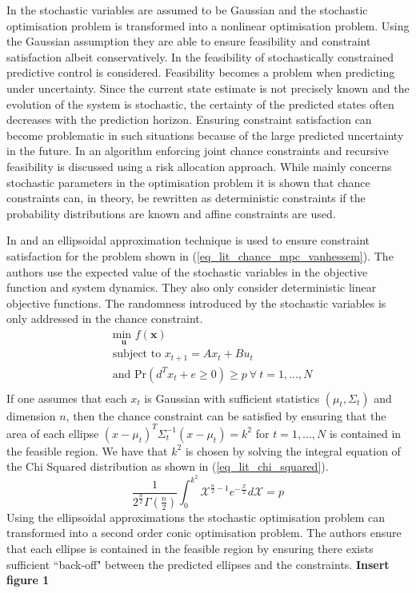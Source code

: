 In \cite{li2} the stochastic variables are assumed to be Gaussian and the stochastic optimisation problem is transformed into a nonlinear optimisation problem. Using the Gaussian assumption they are able to ensure feasibility and constraint satisfaction albeit conservatively. In \cite{masahiro} the feasibility of stochastically constrained predictive control is considered. Feasibility becomes a problem when predicting under uncertainty. Since the current state estimate is not precisely known and the evolution of the system is stochastic, the certainty of the predicted states often decreases with the prediction horizon. Ensuring constraint satisfaction can become problematic in such situations because of the large predicted uncertainty in the future. In \cite{masahiro} an algorithm enforcing joint chance constraints and recursive feasibility is discussed using a risk allocation approach. While \cite{schwarm} mainly concerns stochastic parameters in the optimisation problem it is shown that chance constraints can, in theory, be rewritten as deterministic constraints if the probability distributions are known and affine constraints are used. 

In \cite{vanhessem2} and \cite{vanhessem1} an ellipsoidal approximation technique is used to ensure constraint satisfaction for the problem shown in (\ref{eq_lit_chance_mpc_vanhessem}). The authors use the expected value of the stochastic variables in the objective function and system dynamics. They also only consider deterministic linear objective functions. The randomness introduced by the stochastic variables is only addressed in the chance constraint. 
\begin{equation}
\begin{aligned}
&\underset{\mathbf{u}}{\text{min }} f(\mathbf{x}) \\
& \text{subject to } x_{t+1}=Ax_t+Bu_t \\
& \text{and } \text{Pr}(d^Tx_t + e \geq 0) \geq p ~\forall ~t=1,...,N\\
\end{aligned}
\label{eq_lit_chance_mpc_vanhessem}
\end{equation}
If one assumes that each $x_t$ is Gaussian with sufficient statistics $(\mu_t, \Sigma_t)$ and dimension $n$, then the chance constraint can be satisfied by ensuring that the area of each ellipse $(x-\mu_t)^T\Sigma_t^{-1}(x-\mu_t)=k^2$ for $t=1,...,N$ is contained in the feasible region. We have that $k^2$ is chosen by solving the integral equation of the Chi Squared distribution as shown in (\ref{eq_lit_chi_squared}).
\begin{equation}
\frac{1}{2^{\frac{n}{2}}\Gamma(\frac{n}{2})}\int_0^{k^2}\mathcal{X}^{\frac{n}{2}-1}e^{-\frac{\mathcal{X}}{2}}d\mathcal{X} = p
\label{eq_lit_chi_squared}
\end{equation} 
Using the ellipsoidal approximations the stochastic optimisation problem can transformed into a second order conic optimisation problem. The authors ensure that each ellipse is contained in the feasible region by ensuring there exists sufficient ``back-off" between the predicted ellipses and the constraints. \textbf{Insert figure 1}

